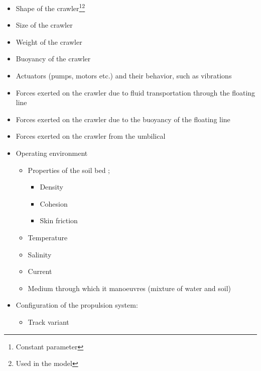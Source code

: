 \begin{itemize}
    \setlength\itemsep{0mm}
    \item Shape of the crawler\footnote{\label{c} Constant parameter}\footnote{\label{used} Used in the model}
    \item Size of the crawler\footnotemark[\getrefnumber{c}]
    \item Weight of the crawler\footnotemark[\getrefnumber{c}]
    \item Buoyancy of the crawler\footnotemark[\getrefnumber{c}]
    \item Actuators (pumps, motors etc.) and their behavior, such as vibrations
    \item Forces exerted on the crawler due to fluid transportation through the floating line
    \item Forces exerted on the crawler due to the buoyancy of the floating line
    \item Forces exerted on the crawler from the umbilical
    \item Operating environment
    \begin{itemize}
        \setlength\itemsep{0mm}
        \item Properties of the soil bed \cite{lotman_applicable_2009};
        \begin{itemize}
            \setlength\itemsep{0mm}
            \item Density
            \item Cohesion
            \item Skin friction
        \end{itemize}
        \item Temperature
        \item Salinity
        \item Current
        \item Medium through which it manoeuvres (mixture of water and soil)
    \end{itemize}
    \item Configuration of the propulsion system:
    \begin{itemize}
        \setlength\itemsep{0mm}
        \item Track variant \cite{lotman_applicable_2009}
        \begin{itemize}

\end{itemize}
\end{itemize}
\end{itemize}
